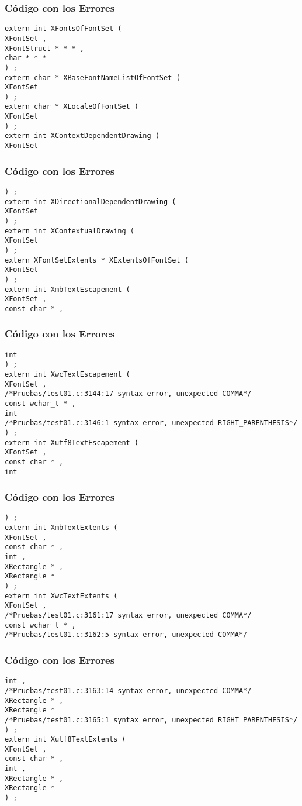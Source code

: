 \documentclass{beamer}
\begin{document}
\begin{frame}[fragile]
\frametitle{C\'odigo con los Errores}
\begin{verbatim}
extern int XFontsOfFontSet ( 
XFontSet , 
XFontStruct * * * , 
char * * * 
) ; 
extern char * XBaseFontNameListOfFontSet ( 
XFontSet 
) ; 
extern char * XLocaleOfFontSet ( 
XFontSet 
) ; 
extern int XContextDependentDrawing ( 
XFontSet 
\end{verbatim}
\end{frame}
\begin{frame}[fragile]
\frametitle{C\'odigo con los Errores}
\begin{verbatim}
) ; 
extern int XDirectionalDependentDrawing ( 
XFontSet 
) ; 
extern int XContextualDrawing ( 
XFontSet 
) ; 
extern XFontSetExtents * XExtentsOfFontSet ( 
XFontSet 
) ; 
extern int XmbTextEscapement ( 
XFontSet , 
const char * , 
\end{verbatim}
\end{frame}
\begin{frame}[fragile]
\frametitle{C\'odigo con los Errores}
\begin{verbatim}
int 
) ; 
extern int XwcTextEscapement ( 
XFontSet , 
/*Pruebas/test01.c:3144:17 syntax error, unexpected COMMA*/
const wchar_t * , 
int 
/*Pruebas/test01.c:3146:1 syntax error, unexpected RIGHT_PARENTHESIS*/
) ; 
extern int Xutf8TextEscapement ( 
XFontSet , 
const char * , 
int 
\end{verbatim}
\end{frame}
\begin{frame}[fragile]
\frametitle{C\'odigo con los Errores}
\begin{verbatim}
) ; 
extern int XmbTextExtents ( 
XFontSet , 
const char * , 
int , 
XRectangle * , 
XRectangle * 
) ; 
extern int XwcTextExtents ( 
XFontSet , 
/*Pruebas/test01.c:3161:17 syntax error, unexpected COMMA*/
const wchar_t * , 
/*Pruebas/test01.c:3162:5 syntax error, unexpected COMMA*/
\end{verbatim}
\end{frame}
\begin{frame}[fragile]
\frametitle{C\'odigo con los Errores}
\begin{verbatim}
int , 
/*Pruebas/test01.c:3163:14 syntax error, unexpected COMMA*/
XRectangle * , 
XRectangle * 
/*Pruebas/test01.c:3165:1 syntax error, unexpected RIGHT_PARENTHESIS*/
) ; 
extern int Xutf8TextExtents ( 
XFontSet , 
const char * , 
int , 
XRectangle * , 
XRectangle * 
) ; 
\end{verbatim}
\end{frame}
\end{document}
